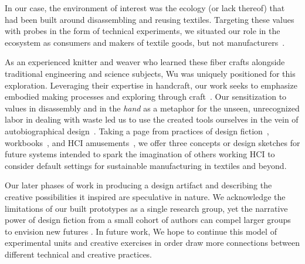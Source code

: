 In our case, the environment of interest was the ecology (or lack thereof) that had been built around disassembling and reusing textiles. Targeting these values with probes in the form of technical experiments, we situated our role in the ecosystem as consumers and makers of textile goods, but not manufacturers~\cite{gaver_design:_1999, gaver_what_2012}. 

As an experienced knitter and weaver who learned these fiber crafts alongside traditional engineering and science subjects, Wu was uniquely positioned for this exploration. Leveraging their expertise in handcraft, our work seeks to emphasize embodied making processes and exploring through craft~\cite{ingold_making:_2013}. Our sensitization to values in disassembly and in the \emph{hand} as a metaphor for the unseen, unrecognized labor in dealing with waste \cite{rifat_breaking_2019} led us to use the created tools ourselves in the vein of autobiographical design~\cite{neustaedter_autobiographical_2012, desjardins_living_2016, desjardins_revealing_2018}. Taking a page from practices of design fiction~\cite{kirsh_how_2011, blythe_pastiche_2004}, workbooks~\cite{gaver_making_2011}, and HCI amusements~\cite{devendorf_hci-amusement_2019}, we offer three concepts or design sketches for future systems intended to spark the imagination of others working HCI to consider default settings for sustainable manufacturing in textiles and beyond.

Our later phases of work in producing a design artifact and describing the creative possibilities it inspired are speculative in nature. We acknowledge the limitations of our built prototypes as a single research group, yet the narrative power of design fiction from a small cohort of authors can compel larger groups to envision new futures \cite{dunne_speculative_2013}. In future work, We hope to continue this model of experimental units and creative exercises in order draw more connections between different technical and creative practices.

